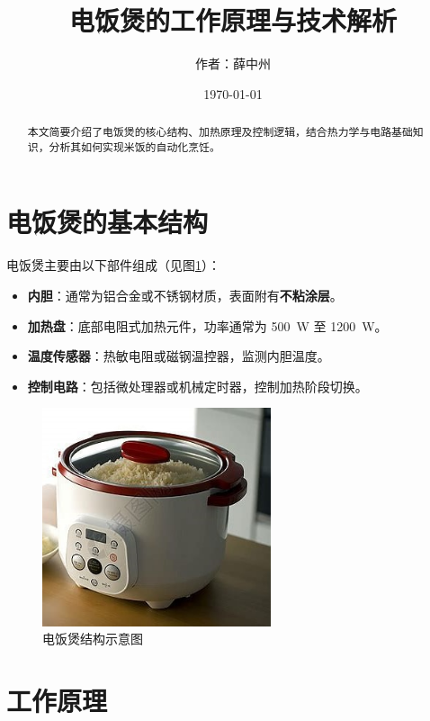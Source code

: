 \documentclass[UTF8]{ctexart}
\title{电饭煲的工作原理与技术解析}
\author{作者：薛中州}
\date{\today}
\begin{document}
\maketitle
\listoftables %
\begin{abstract}%
\pagestyle{plain}%
本文简要介绍了电饭煲的核心结构、加热原理及控制逻辑，结合热力学与电路基础知识，分析其如何实现米饭的自动化烹饪。
\end{abstract}

\section{电饭煲的基本结构}
电饭煲主要由以下部件组成（见图\ref{fig:rice_cooker_structure}）：%
\begin{itemize}%
    \item \textbf{内胆}：通常为铝合金或不锈钢材质，表面附有\textbf{不粘涂层}。
    \item \textbf{加热盘}：底部电阻式加热元件，功率通常为 \SI{500}{\watt} 至 \SI{1200}{\watt}。
    \item \textbf{温度传感器}：热敏电阻或磁钢温控器，监测内胆温度。
    \item \textbf{控制电路}：包括微处理器或机械定时器，控制加热阶段切换。
\end{itemize}

\begin{figure}[ht]
    \centering
    \includegraphics[width=0.6\textwidth]{images/rice_cooker_diagram.png} %
    \caption{电饭煲结构示意图}
    \label{fig:rice_cooker_structure}
\end{figure}

\section{工作原理}
\end{document}

